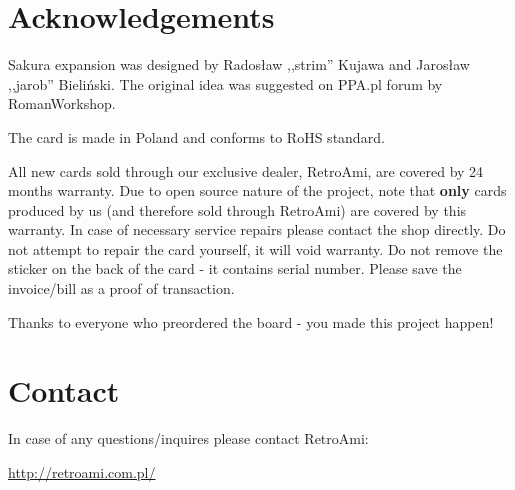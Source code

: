 \documentclass[10pt,a5paper]{article}
\begin{document}
\section*{Acknowledgements}

Sakura expansion was designed by Radosław ,,strim'' Kujawa and Jarosław ,,jarob'' Bieliński. The original idea was suggested on PPA.pl forum by RomanWorkshop. 

The card is made in Poland and conforms to RoHS standard. 

All new cards sold through our exclusive dealer, RetroAmi, are covered by 24 months warranty. Due to open source nature of the project, note that {\bf only} cards produced by us (and therefore sold through RetroAmi) are covered by this warranty. In case of necessary service repairs please contact the shop directly. Do not attempt to repair the card yourself, it will void warranty. Do not remove the sticker on the back of the card - it contains serial number. Please save the invoice/bill as a proof of transaction.

Thanks to everyone who preordered the board - you made this project happen!

\section*{Contact}

In case of any questions/inquires please contact RetroAmi:

\url{http://retroami.com.pl/} 
\end{document}
